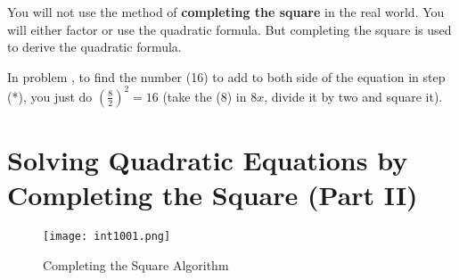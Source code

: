 You will not use the method of \textbf{completing the square} in the real world. You will either factor or use the quadratic formula. But completing the square is used to derive the quadratic formula.

In problem , to find the number (16) to add to both side of the equation in step (*), you just do $\left(\frac{8}{2}\right)^{2}=16$ (take the (8) in $8x$, divide it by two and square it).

\section{Solving Quadratic Equations by Completing the Square (Part II)}

\newpage

\begin{figure}[htb!]
  \centering
  \texttt{[image: int1001.png]}
  \caption{Completing the Square Algorithm}
\end{figure}

\vspace{.3cm}

